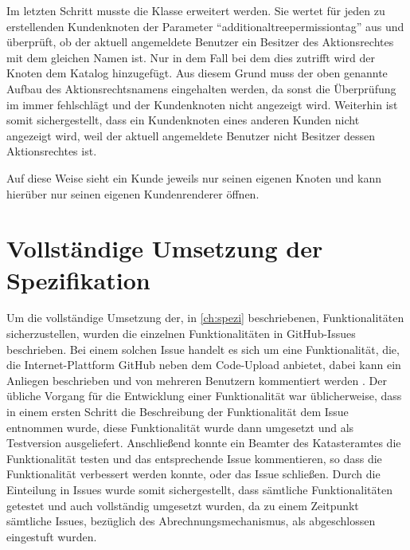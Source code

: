 Im letzten Schritt musste die Klasse  erweitert werden.
Sie wertet für jeden zu erstellenden Kundenknoten der Parameter "`additionaltreepermissiontag"' aus und überprüft, ob der aktuell angemeldete Benutzer ein Besitzer des Aktionsrechtes mit dem gleichen Namen ist.
Nur in dem Fall bei dem dies zutrifft wird der Knoten dem Katalog hinzugefügt.
Aus diesem Grund muss der oben genannte Aufbau des Aktionsrechtsnamens eingehalten werden, da sonst die Überprüfung im   immer fehlschlägt und der Kundenknoten nicht angezeigt wird.
Weiterhin ist somit sichergestellt, dass ein Kundenknoten eines anderen Kunden nicht angezeigt wird, weil der aktuell angemeldete Benutzer nicht Besitzer dessen Aktionsrechtes ist.

Auf diese Weise sieht ein Kunde jeweils nur seinen eigenen Knoten und kann hierüber nur seinen eigenen Kundenrenderer öffnen. 



\section{Vollständige Umsetzung der Spezifikation}
Um die vollständige Umsetzung der, in \autoref{ch:spezi} beschriebenen, Funktionalitäten sicherzustellen, wurden die einzelnen Funktionalitäten in GitHub-Issues beschrieben.
Bei einem solchen Issue handelt es sich um eine Funktionalität, die, die Internet-Plattform GitHub neben dem Code-Upload anbietet, dabei kann ein Anliegen beschrieben und von mehreren Benutzern kommentiert werden \autocite[vgl.][]{github-issue}.
Der übliche Vorgang für die Entwicklung einer Funktionalität war üblicherweise, dass in einem ersten Schritt die Beschreibung der Funktionalität dem Issue entnommen wurde, diese Funktionalität wurde dann umgesetzt und als Testversion ausgeliefert.
Anschließend konnte ein Beamter des Katasteramtes die Funktionalität testen und das entsprechende Issue kommentieren, so dass die Funktionalität verbessert werden konnte, oder das Issue schließen.
Durch die Einteilung in Issues wurde somit sichergestellt, dass sämtliche Funktionalitäten getestet und auch vollständig umgesetzt wurden, da zu einem Zeitpunkt sämtliche Issues, bezüglich des Abrechnungsmechanismus, als abgeschlossen eingestuft wurden.

